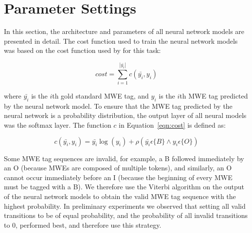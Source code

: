 \documentclass[11pt,a4paper]{article}
\newcommand{\eqnref}[1]{Equation~\ref{#1}}
\begin{document}

\section{Parameter Settings}

In this section, the architecture and parameters of all neural network
models are presented in detail. The cost function used to train the
neural network models was based on the cost function used by
 for this task:

\begin{equation}
cost = \sum_{i=1}^{|\bar{y_i}|} c(\bar{y_i},y_i) 
\label{eqn:cost}
\end{equation} 

\vspace{5mm}

\noindent
where $\bar{y_i}$ is the $i$th gold standard MWE tag, and $y_i$ is the
$i$th MWE tag predicted by the neural network model. To ensure that
the MWE tag predicted by the neural network is a probability
distribution, the output layer of all neural models was the softmax
layer. The function $c$ in \eqnref{eqn:cost} is defined as:

\begin{equation}
c(\bar{y_i},y_i) = \bar{y_i} \log(y_i) + \rho (\bar{y_i} \epsilon \{B\} \land y_i \epsilon \{O\})
\label{eqn:c}
\end{equation}

\vspace{5mm}


Some MWE tag sequences are invalid, for example, a
{\selectfont B} followed immediately by an
{\selectfont O} (because MWEs are composed of
multiple tokens), and similarly, an {\selectfont O}
cannot occur immediately before an {\selectfont I}
(because the beginning of every MWE must be tagged with a
{\selectfont B}).  We therefore use the Viterbi
algorithm on the output of the neural network models to obtain the
valid MWE tag sequence with the highest probability. In preliminary
experiments we observed that setting all valid transitions to be of
equal probability, and the probability of all invalid transitions to
0, performed best, and therefore use this strategy.
\end{document}
